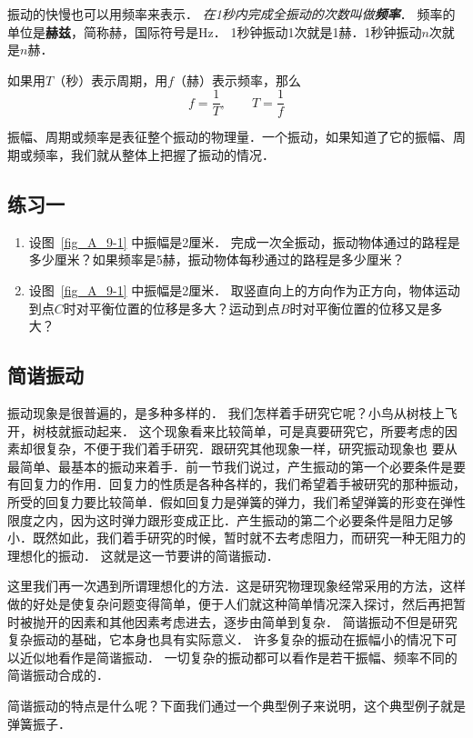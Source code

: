 振动的快慢也可以用频率来表示．
\textit{在1秒内完成全振动的次数叫做\textbf{频率}}．
频率的单位是\textbf{赫兹}，简称赫，国际符号是Hz．
1秒钟振动1次就是1赫．1秒钟振动$n$次就是$n$赫．

如果用$T$（秒）表示周期，用$f$（赫）表示频率，那么
\[f=\frac{1}{T},\qquad T=\frac{1}{f}\]

振幅、周期或频率是表征整个振动的物理量．一个振动，如果知道了它的振幅、周期或频率，我们就从整体上把握了振动的情况．

\subsection*{练习一}
\begin{enumerate}
    \item 设图~\ref{fig_A_9-1} 中振幅是2厘米．
    完成一次全振动，振动物体通过的路程是多少厘米？如果频率是5赫，振动物体每秒通过的路程是多少厘米？
    \item 设图~\ref{fig_A_9-1} 中振幅是2厘米．
    取竖直向上的方向作为正方向，物体运动到点$C$时对平衡位置的位移是多大？运动到点$B$时对平衡位置的位移又是多大？
\end{enumerate}


\subsection{简谐振动}
振动现象是很普遍的，是多种多样的．
我们怎样着手研究它呢？小鸟从树枝上飞开，树枝就振动起来．
这个现象看来比较简单，可是真要研究它，所要考虑的因素却很复杂，不便于我们着手研究．跟研究其他现象一样，研究振动现象也
要从最简单、最基本的振动来着手．前一节我们说过，产生振动的第一个必要条件是要有回复力的作用．回复力的性质是各种各样的，我们希望着手被研究的那种振动，所受的回复力要比较简单．假如回复力是弹簧的弹力，我们希望弹簧的形变在弹性限度之内，因为这时弹力跟形变成正比．产生振动的第二个必要条件是阻力足够小．既然如此，我们着手研究的时候，暂时就不去考虑阻力，而研究一种无阻力的理想化的振动．
这就是这一节要讲的简谐振动．

这里我们再一次遇到所谓理想化的方法．这是研究物理现象经常采用的方法，这样做的好处是使复杂问题变得简单，便于人们就这种简单情况深入探讨，然后再把暂时被抛开的因素和其他因素考虑进去，逐步由简单到复杂．
简谐振动不但是研究复杂振动的基础，它本身也具有实际意义．
许多复杂的振动在振幅小的情况下可以近似地看作是简谐振动．
一切复杂的振动都可以看作是若干振幅、频率不同的简谐振动合成的．

简谐振动的特点是什么呢？下面我们通过一个典型例子来说明，这个典型例子就是弹簧振子．

